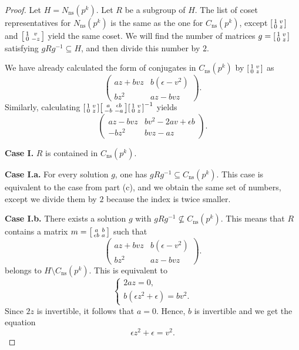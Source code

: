 \documentclass[10pt,a4paper]{amsart}
\newcommand\sm[1]{\begin{bsmallmatrix}#1\end{bsmallmatrix}}
\begin{document}
\begin{proof}
    Let $H=N_{\mathrm{ns}}(p^k)$. Let $R$ be a subgroup of $H$. The list of coset representatives for $N_{\mathrm{ns}}(p^k)$ is the same as the one for $C_{\mathrm{ns}}(p^k)$, except $\sm{1 & v \\ 0 & z}$ and $\sm{1 & v \\ 0 & -z}$ yield the same coset. We will find the number of matrices $g=\sm{1 & v \\ 0 & z}$ satisfying $gRg^{-1}\subseteq H$, and then divide this number by $2$.
    
   We have already calculated the form of conjugates in $C_{\mathrm{ns}}(p^k)$ by $\sm{1 & v \\ 0 & z}$ as 
    $$\begin{pmatrix} az+bvz & b(\epsilon - v^2) \\
bz^2 & az-bvz\end{pmatrix}.$$
Similarly, calculating $\sm{1 & v \\0 & z}\sm{a & \epsilon b \\ -b  & -a}\sm{1 & v \\ 0 & z}^{-1}$ yields 
  $$\begin{pmatrix} az-bvz & bv^2-2av+\epsilon b \\
-bz^2 & bvz-az\end{pmatrix}.$$

\noindent \textbf{Case I.} $R$ is contained in $C_{\mathrm{ns}}(p^k)$. 

\noindent \textbf{Case I.a.} For every solution $g$, one has $gRg^{-1}\subseteq C_{\mathrm{ns}}(p^k)$. This case is equivalent to the case from part (c), and we obtain the same set of numbers, except we divide them by $2$ because the index is twice smaller.

\noindent \textbf{Case I.b.} There exists a solution $g$ with $gRg^{-1}\not \subseteq C_{\mathrm{ns}}(p^k)$. This means that $R$ contains a matrix $m=\sm{a & b \\ \epsilon b & a}$ such that  $$\begin{pmatrix} az+bvz & b(\epsilon - v^2) \\
bz^2 & az-bvz\end{pmatrix}.$$ belongs to $H\setminus C_{\mathrm{ns}}(p^k)$. This is equivalent to 
\[
\begin{cases}
2az=0, \\[4pt]
b(\epsilon z^2+\epsilon)=bv^2.
\end{cases}
\]
Since $2z$ is invertible, it follows that $a=0$. Hence, $b$ is invertible and we get the equation \begin{equation} \label{bla1}\epsilon z^2+\epsilon=v^2.\end{equation}


\end{proof}
\end{document}
